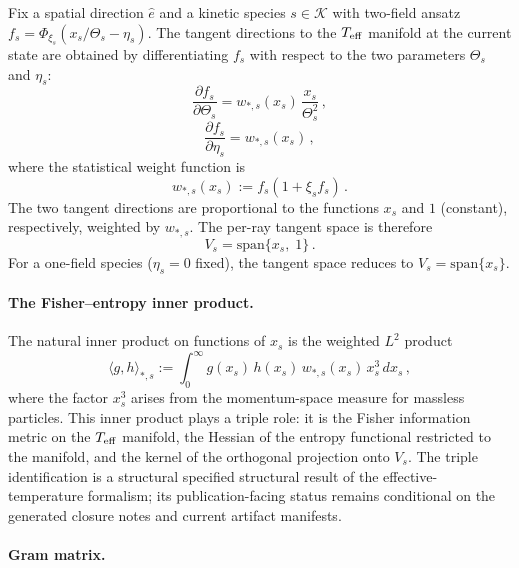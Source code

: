 Fix a spatial direction $\hat{e}$ and a kinetic species
$s \in \mathcal{K}$ with two-field ansatz
$f_s = \Phi_{\xi_s}(x_s/\Theta_s - \eta_s)$.  The
tangent directions to the $T_{\mathrm{eff}}$ manifold at the current
state are obtained by differentiating $f_s$ with respect
to the two parameters $\Theta_s$ and $\eta_s$:
\begin{equation}\label{eq:tangent-dTheta}
\frac{\partial f_s}{\partial \Theta_s}
= w_{*,s}(x_s)\,
  \frac{x_s}{\Theta_s^2}\,,
\end{equation}
\begin{equation}\label{eq:tangent-deta}
\frac{\partial f_s}{\partial \eta_s}
= w_{*,s}(x_s)\,,
\end{equation}
where the statistical weight function is
\begin{equation}\label{eq:stat-weight}
w_{*,s}(x_s)
:= f_s(1 + \xi_s f_s)\,.
\end{equation}
The two tangent directions are proportional to the
functions $x_s$ and $1$ (constant), respectively,
weighted by $w_{*,s}$.  The per-ray tangent space is
therefore
\begin{equation}\label{eq:tangent-space}
V_s = \mathrm{span}\{x_s,\; 1\}\,.
\end{equation}
For a one-field species ($\eta_s = 0$ fixed), the
tangent space reduces to $V_s = \mathrm{span}\{x_s\}$.


\paragraph{The Fisher--entropy inner product.}

The natural inner product on functions of $x_s$ is the
weighted $L^2$ product
\begin{equation}\label{eq:fisher-inner}
\langle g, h \rangle_{*,s}
:= \int_0^\infty
  g(x_s)\, h(x_s)\,
  w_{*,s}(x_s)\, x_s^3\, dx_s\,,
\end{equation}
where the factor $x_s^3$ arises from the
momentum-space measure for massless particles.  This
inner product plays a triple role: it is the
Fisher information metric on the $T_{\mathrm{eff}}$ manifold, the
Hessian of the entropy functional restricted to the
manifold, and the kernel of the orthogonal projection
onto $V_s$.  The triple identification is a structural
specified structural result of the effective-temperature
formalism; its publication-facing status remains conditional on
the generated closure notes and current artifact manifests.


\paragraph{Gram matrix.}

